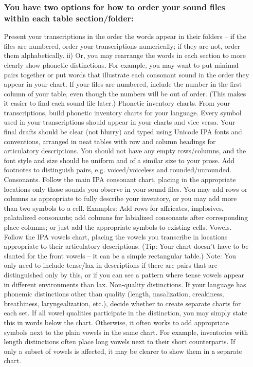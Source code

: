 \documentclass[12pt]{article}
\begin{document}
\subsubsection*{You have two options for how to order your sound files within each table section/folder:}
Present your transcriptions in the order the words appear in their folders – if the files are numbered, order your transcriptions numerically; if they are not, order them alphabetically. ii) Or, you may rearrange the words in each section to more clearly show phonetic distinctions.  For example, you may want to put minimal pairs together or put words that illustrate each consonant sound in the order they appear in your chart.  If your files are numbered, include the number in the first column of your table, even though the numbers will be out of order.  (This makes it easier to find each sound file later.)
Phonetic inventory charts.  From your transcriptions, build phonetic inventory charts for your language.  Every symbol used in your transcriptions should appear in your charts and vice versa.  Your final drafts should be clear (not blurry) and typed using Unicode IPA fonts and conventions, arranged in neat tables with row and column headings for articulatory descriptions.  You should not have any empty rows/columns, and the font style and size should be uniform and of a similar size to your prose.  Add footnotes to distinguish pairs, e.g. voiced/voiceless and rounded/unrounded.
Consonants.  Follow the main IPA consonant chart, placing in the appropriate locations only those sounds you observe in your sound files.  You may add rows or columns as appropriate to fully describe your inventory, or you may add more than two symbols to a cell.  Examples: Add rows for affricates, implosives, palatalized consonants; add columns for labialized consonants after corresponding place columns; or just add the appropriate symbols to existing cells.
Vowels.  Follow the IPA vowels chart, placing the vowels you transcribe in locations appropriate to their articulatory descriptions.  (Tip: Your chart doesn’t have to be slanted for the front vowels – it can be a simple rectangular table.)  Note: You only need to include tense/lax in descriptions if there are pairs that are distinguished only by this, or if you can see a pattern where tense vowels appear in different environments than lax.
Non-quality distinctions.  If your language has phonemic distinctions other than quality (length, nasalization, creakiness, breathiness, laryngealization, etc.), decide whether to create separate charts for each set.  If all vowel qualities participate in the distinction, you may simply state this in words below the chart.  Otherwise, it often works to add appropriate symbols next to the plain vowels in the same chart.  For example, inventories with length distinctions often place long vowels next to their short counterparts.  If only a subset of vowels is affected, it may be clearer to show them in a separate chart.
\end{document}

